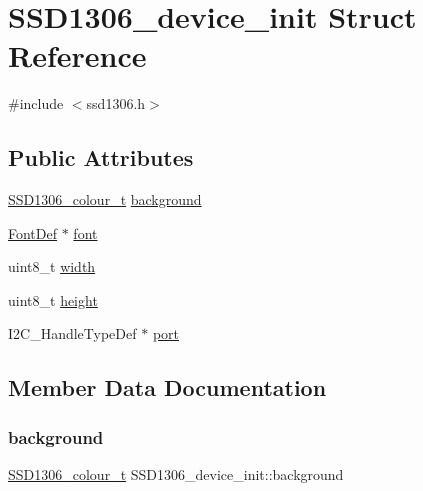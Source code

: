 \hypertarget{structSSD1306__device__init}{}\section{S\+S\+D1306\+\_\+device\+\_\+init Struct Reference}
\label{structSSD1306__device__init}


{\ttfamily \#include $<$ssd1306.\+h$>$}

\subsection*{Public Attributes}
\begin{DoxyCompactItemize}
\item 
\hyperlink{ssd1306_8h_a9fe094fa88309e2ded9db03d4c2771c6}{S\+S\+D1306\+\_\+colour\+\_\+t} \hyperlink{structSSD1306__device__init_a5b952523b16b654831e65fd365deed7c}{background}
\item 
\hyperlink{structFontDef}{Font\+Def} $\ast$ \hyperlink{structSSD1306__device__init_a8a3aa74d6039b08d3954a739aa649c90}{font}
\item 
uint8\+\_\+t \hyperlink{structSSD1306__device__init_ade346ce6bb772d9f116b87468a9b498e}{width}
\item 
uint8\+\_\+t \hyperlink{structSSD1306__device__init_a0c7dca0be7aa18d451a252099844d94b}{height}
\item 
I2\+C\+\_\+\+Handle\+Type\+Def $\ast$ \hyperlink{structSSD1306__device__init_af9dc54ebb2f8136b1657527a6bf8a099}{port}
\end{DoxyCompactItemize}


\subsection{Member Data Documentation}
\mbox{\label{structSSD1306__device__init_a5b952523b16b654831e65fd365deed7c}} 
\subsubsection{\texorpdfstring{background}{background}}
{\footnotesize\ttfamily \hyperlink{ssd1306_8h_a9fe094fa88309e2ded9db03d4c2771c6}{S\+S\+D1306\+\_\+colour\+\_\+t} S\+S\+D1306\+\_\+device\+\_\+init\+::background}

